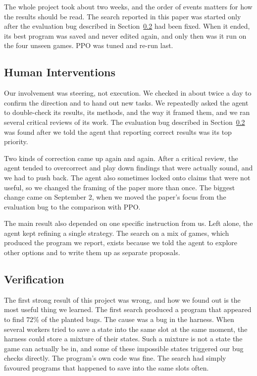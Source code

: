 \documentclass{article}
\begin{document}
The whole project took about two weeks, and the order of events matters for how the results should be read. The search reported in this paper was started only after the evaluation bug described in Section~\ref{sec:verify} had been fixed. When it ended, its best program was saved and never edited again, and only then was it run on the four unseen games. PPO was tuned and re-run last.

\subsection{Human Interventions}
\label{sec:human}
Our involvement was steering, not execution. We checked in about twice a day to confirm the direction and to hand out
new tasks. We repeatedly asked the agent to double-check its results, its methods, and the way it framed them, and we
ran several critical reviews of its work. The evaluation bug described in Section~\ref{sec:verify} was found after we
told the agent that reporting correct results was its top priority.

Two kinds of correction came up again and again. After a critical review, the agent tended to overcorrect and play down
findings that were actually sound, and we had to push back. The agent also sometimes locked onto claims that were not
useful, so we changed the framing of the paper more than once. The biggest change came on September 2, when we moved
the paper's focus from the evaluation bug to the comparison with PPO.

The main result also depended on one specific instruction from us. Left alone, the agent kept refining a single
strategy. The search on a mix of games, which produced the program we report, exists because we told the agent to
explore other options and to write them up as separate proposals.

\subsection{Verification}
\label{sec:verify}
The first strong result of this project was wrong, and how we found out is the most useful thing we learned. The first
search produced a program that appeared to find $72\%$ of the planted bugs. The cause was a bug in the harness. When
several workers tried to save a state into the same slot at the same moment, the harness could store a mixture of their
states. Such a mixture is not a state the game can actually be in, and some of these impossible states triggered our
bug checks directly. The program's own code was fine. The search had simply favoured programs that happened to save
into the same slots often.
\end{document}

